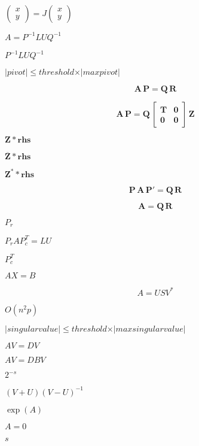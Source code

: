\documentclass{article}
\begin{document}
$ \left ( \begin{array}{cc} x \\ y \end{array} \right )  =  J \left ( \begin{array}{cc} x \\ y \end{array} \right )
$
\pagebreak

$ A = P^{-1} L U Q^{-1} $
\pagebreak

$ P^{-1} L U Q^{-1} $
\pagebreak

$ \vert pivot \vert \leqslant threshold \times \vert maxpivot \vert $
\pagebreak

\[
 \mathbf{A} \, \mathbf{P} = \mathbf{Q} \, \mathbf{R}
\]
\pagebreak

\[
 \mathbf{A} \, \mathbf{P} = \mathbf{Q} \,
                    \begin{bmatrix} \mathbf{T} &  \mathbf{0} \\
                                    \mathbf{0} & \mathbf{0} \end{bmatrix} \, \mathbf{Z}
\]
\pagebreak

$ \mathbf{Z} * \mathbf{rhs} $
\pagebreak

$ \mathbf{\overline Z} * \mathbf{rhs} $
\pagebreak

$ \mathbf{Z}^* * \mathbf{rhs} $
\pagebreak

\[
 \mathbf{P} \, \mathbf{A} \, \mathbf{P}' = \mathbf{Q} \, \mathbf{R}
\]
\pagebreak

\[
 \mathbf{A} = \mathbf{Q} \, \mathbf{R}
\]
\pagebreak

$ P_r $
\pagebreak

$P_r A P_c^T = L U$
\pagebreak

$ P_c^T $
\pagebreak

$ A X = B $
\pagebreak

\[ A = U S V^* \]
\pagebreak

$ O(n^2p) $
\pagebreak

$ \vert singular value \vert \leqslant threshold \times \vert max singular value \vert $
\pagebreak

$ A V = D V $
\pagebreak

$ A V = D B V $
\pagebreak

$ 2^{-s} $
\pagebreak

$ (V+U)(V-U)^{-1} $
\pagebreak

$ \exp(A) $
\pagebreak

$ A = 0 $
\pagebreak

$ s $
\pagebreak
\end{document}
